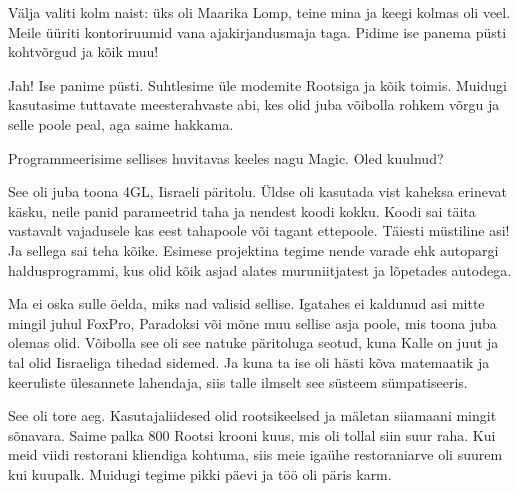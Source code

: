 Välja valiti kolm naist: üks oli Maarika Lomp, teine mina ja keegi kolmas oli veel. Meile 
üüriti kontoriruumid vana ajakirjandusmaja taga. Pidime ise panema 
püsti kohtvõrgud ja kõik muu! 


Jah! Ise panime püsti. Suhtlesime üle modemite Rootsiga ja kõik toimis. Muidugi kasutasime tuttavate meesterahvaste abi, kes olid juba võibolla rohkem võrgu ja selle poole peal, aga saime hakkama. 

Programmeerisime sellises huvitavas keeles nagu Magic. Oled 
kuulnud? 


See oli juba toona 4GL, Iisraeli päritolu. Üldse 
oli kasutada vist kaheksa erinevat käsku, neile panid 
parameetrid taha ja nendest koodi kokku. Koodi sai täita vastavalt 
vajadusele kas eest tahapoole või tagant ettepoole. Täiesti müstiline asi! Ja 
sellega sai teha kõike. Esimese projektina tegime nende varade ehk 
autopargi haldusprogrammi, kus olid kõik asjad alates muruniitjatest ja lõpetades 
autodega. 


Ma ei oska sulle öelda, miks nad valisid sellise. Igatahes ei kaldunud asi mitte mingil juhul FoxPro, 
Paradoksi või mõne muu sellise asja poole, mis toona juba olemas olid. 
Võibolla see oli see natuke päritoluga seotud, kuna Kalle on juut ja tal 
olid Iisraeliga tihedad sidemed. Ja kuna ta ise oli hästi kõva matemaatik ja 
keeruliste ülesannete lahendaja, siis talle ilmselt see 
süsteem sümpatiseeris. 

See oli tore aeg. Kasutajaliidesed olid rootsikeelsed ja mäletan siiamaani mingit 
sõnavara. Saime palka 800 Rootsi krooni kuus, mis oli 
tollal siin suur raha. Kui meid viidi restorani kliendiga 
kohtuma, siis meie igaühe restoraniarve oli suurem kui kuupalk. 
Muidugi tegime pikki päevi ja töö oli päris karm. 


